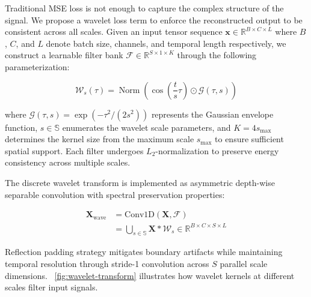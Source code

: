 \documentclass[conference]{IEEEtran}
\begin{document}
Traditional MSE loss  is not enough to capture the complex structure of the signal. We propose a wavelet loss term to enforce the reconstructed output to be consistent across all scales. Given an input tensor sequence $\mathbf{x} \in \mathbb{R}^{B \times C \times L}$ where $B$, $C$, and $L$ denote batch size, channels, and temporal length respectively, we construct a learnable filter bank $\mathcal{F} \in \mathbb{R}^{S \times 1 \times K}$ through the following parameterization:

\begin{equation}
    \label{eq:wavelet}
    \mathcal{W}_s(\tau) = \operatorname{Norm} \left(\cos\left(\frac{t}{s}\tau\right) \odot \mathcal{G}(\tau,s)\right)
\end{equation}

where $\mathcal{G}(\tau,s) = \exp(-\tau^2/(2s^2))$ represents the Gaussian envelope function, $s \in \mathbb{S}$ enumerates the wavelet scale parameters, and $K=4s_{\text{max}}$ determines the kernel size from the maximum scale $s_{\text{max}}$ to ensure sufficient spatial support. Each filter undergoes $L_2$-normalization to preserve energy consistency across multiple scales.

The discrete wavelet transform is implemented as asymmetric depth-wise separable convolution with spectral preservation properties:

\begin{equation}
    \begin{aligned}
        \mathbf{X}_{\text{wave}} & = \text{Conv1D}(\mathbf{X}, \mathcal{F})                                                                 \\
                                 & = \bigcup_{s \in \mathbb{S}} \mathbf{X} \ast \mathcal{W}_s \in \mathbb{R}^{B \times C \times S \times L}
    \end{aligned}
\end{equation}

Reflection padding strategy mitigates boundary artifacts while maintaining temporal resolution through stride-1 convolution across $S$ parallel scale dimensions. \figurename~\ref{fig:wavelet-transform} illustrates how wavelet kernels at different scales filter input signals.
\end{document}

